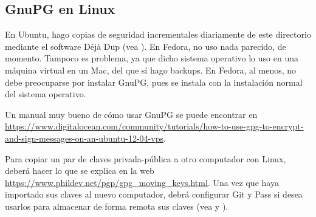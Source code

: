 \subsection{GnuPG en Linux}\label{subsec:gnupg-l}
En Ubuntu, hago copias de seguridad incrementales diariamente de este directorio mediante el software Déjà Dup
(vea ). En Fedora, no uso nada parecido, de momento. Tampoco es problema, ya que dicho
sistema operativo lo uso en una máquina virtual en un Mac, del que sí hago backups. En Fedora, al menos, no debe
preocuparse por instalar GnuPG, pues se instala con la instalación normal del sistema operativo.

Un manual muy bueno de cómo usar GnuPG se puede encontrar en
\url{https://www.digitalocean.com/community/tutorials/how-to-use-gpg-to-encrypt-and-sign-messages-on-an-ubuntu-12-04-vps}.

Para copiar un par de claves privada-pública a otro computador con Linux, deberá hacer lo que se explica en la
web \url{https://www.phildev.net/pgp/gpg_moving_keys.html}. Una vez que haya importado sus claves al nuevo
computador, debrá configurar Git y Pass si desea usarlos para almacenar de forma remota sus claves (vea
 y ).
